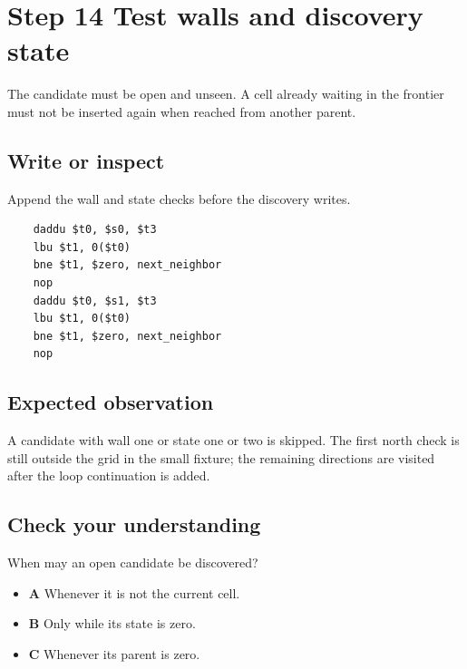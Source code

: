 \section{Step 14 Test walls and discovery state}\label{maze-s14}

The candidate must be open and unseen. A cell already waiting in the frontier must not be inserted again when reached from another parent.

\subsection{Write or inspect}

Append the wall and state checks before the discovery writes.

\begin{verbatim}
    daddu $t0, $s0, $t3
    lbu $t1, 0($t0)
    bne $t1, $zero, next_neighbor
    nop
    daddu $t0, $s1, $t3
    lbu $t1, 0($t0)
    bne $t1, $zero, next_neighbor
    nop
\end{verbatim}

\subsection{Expected observation}

A candidate with wall one or state one or two is skipped. The first north check is still outside the grid in the small fixture; the remaining directions are visited after the loop continuation is added.

\subsection{Check your understanding}

When may an open candidate be discovered?

\begin{itemize}
  \item \textbf{A} Whenever it is not the current cell.
  \item \textbf{B} Only while its state is zero.
  \item \textbf{C} Whenever its parent is zero.
\end{itemize}
